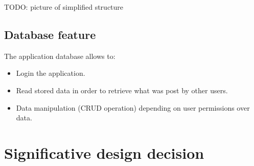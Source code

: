 	TODO: picture of simplified structure 

	\subsection{Database feature}
	The application database allows to:
	
	\begin{itemize}
		\item Login the application.
		\item Read stored data in order to retrieve what was post by other users.
		\item Data manipulation (CRUD operation) depending on user permissions over data.
	\end{itemize}
	
	
\section{Significative design decision}